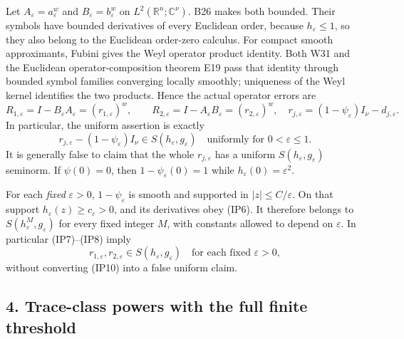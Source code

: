 \documentclass[
  11pt,
]{article}
\begin{document}
Let \(A_\varepsilon=a_\varepsilon^w\) and
\(B_\varepsilon=b_\varepsilon^w\) on \(L^2(\mathbb R^n;\mathbb C^\nu)\).
B26 makes both bounded. Their symbols have bounded derivatives of every
Euclidean order, because \(h_\varepsilon\le1\), so they also belong to
the Euclidean order-zero calculus. For compact smooth approximants,
Fubini gives the Weyl operator product identity. Both W31 and the
Euclidean operator-composition theorem E19 pass that identity through
bounded symbol families converging locally smoothly; uniqueness of the
Weyl kernel identifies the two products. Hence the actual operator
errors are \[
 R_{1,\varepsilon}=I-B_\varepsilon A_\varepsilon
       =(r_{1,\varepsilon})^w,\qquad
 R_{2,\varepsilon}=I-A_\varepsilon B_\varepsilon
       =(r_{2,\varepsilon})^w,
 \quad
 r_{j,\varepsilon}
       =(1-\psi_\varepsilon)I_\nu-d_{j,\varepsilon}.
 \tag{IP8}
\] In particular, the uniform assertion is exactly \[
 r_{j,\varepsilon}-(1-\psi_\varepsilon)I_\nu
       \in S(h_\varepsilon,g_\varepsilon)
       \quad\text{uniformly for }0<\varepsilon\le1 .
 \tag{IP9}
\] It is generally false to claim that the whole \(r_{j,\varepsilon}\)
has a uniform \(S(h_\varepsilon,g_\varepsilon)\) seminorm. If
\(\psi(0)=0\), then \(1-\psi_\varepsilon(0)=1\) while
\(h_\varepsilon(0)=\varepsilon^2\).

For each \emph{fixed} \(\varepsilon>0\), \(1-\psi_\varepsilon\) is
smooth and supported in \(|z|\le C/\varepsilon\). On that support
\(h_\varepsilon(z)\ge c_\varepsilon>0\), and its derivatives obey (IP6).
It therefore belongs to \(S(h_\varepsilon^M,g_\varepsilon)\) for every
fixed integer \(M\), with constants allowed to depend on
\(\varepsilon\). In particular (IP7)--(IP8) imply \[
 r_{1,\varepsilon},r_{2,\varepsilon}
       \in S(h_\varepsilon,g_\varepsilon)
       \quad\text{for each fixed }\varepsilon>0,
 \tag{IP10}
\] without converting (IP10) into a false uniform claim.

\subsection{4. Trace-class powers with the full finite
threshold}\label{trace-class-powers-with-the-full-finite-threshold}
\end{document}
